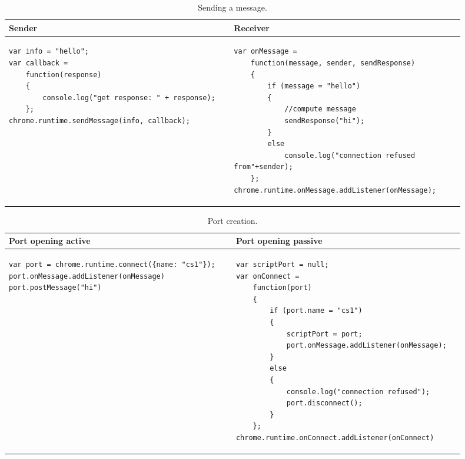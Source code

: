\lstset{language=java,showstringspaces=false}
\begin{table}[tlb]
\begin{small}
\begin{center}
\begin{tabular}{p{0.45\linewidth} | p{0.45\linewidth}}
Sender & Receiver\\
\hline
\begin{lstlisting} 
var info = "hello";
var callback = 
	function(response) 
	{ 
		console.log("get response: " + response);
	};
chrome.runtime.sendMessage(info, callback);
\end{lstlisting}&
\begin{lstlisting} 
var onMessage = 
	function(message, sender, sendResponse) 
	{ 
		if (message = "hello") 
		{
		    //compute message
			sendResponse("hi");
		}
		else 
			console.log("connection refused from"+sender);
	};
chrome.runtime.onMessage.addListener(onMessage);
\end{lstlisting}\\
\end{tabular}
\end{center}
\end{small}
\caption{Sending a message.}
\label{tab:MPIMessage}
\end{table}

\begin{table}
\begin{small}
\begin{center}
\begin{tabular}{p{0.45\linewidth} | p{0.45\linewidth}}
Port opening active & Port opening passive\\
\hline
\begin{lstlisting} 
var port = chrome.runtime.connect({name: "cs1"});
port.onMessage.addListener(onMessage)
port.postMessage("hi")
\end{lstlisting}&
\begin{lstlisting} 
var scriptPort = null;
var onConnect = 
	function(port) 
	{ 
		if (port.name = "cs1") 
		{
			scriptPort = port;
			port.onMessage.addListener(onMessage);
		} 
		else 
		{
			console.log("connection refused"); 
			port.disconnect();
		}
	};
chrome.runtime.onConnect.addListener(onConnect)
\end{lstlisting}\\
\end{tabular}
\end{center}
\end{small}
\caption{Port creation.}
\label{tab:MPIPort}
\end{table}

